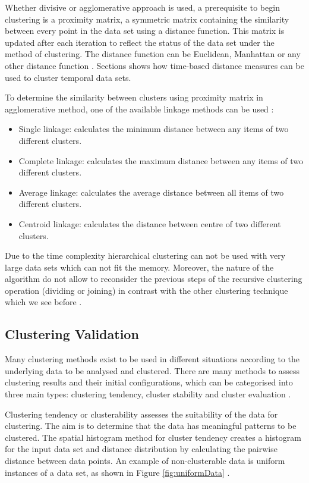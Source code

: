 Whether divisive or agglomerative approach is used, a prerequisite to begin clustering is a proximity matrix, a symmetric matrix containing the similarity between every point in the data set using a distance function. This matrix is updated after each iteration to reflect the status of the data set under the method of clustering. The distance function can be Euclidean, Manhattan or any other distance function \cite{Zaki2014}. Sections shows how time-based distance measures can be used to cluster temporal data sets.

To determine the similarity between clusters using proximity matrix in agglomerative method, one of the available linkage methods can be used \cite{Wang2006}:

\begin{itemize}
    \item Single linkage: calculates the minimum distance between any items of two different clusters.
    \item Complete linkage: calculates the maximum distance between any items of two different clusters.
    \item Average linkage: calculates the average distance between all items of two different clusters.
    \item Centroid linkage: calculates the distance between centre of two different clusters.
\end{itemize}

Due to the time complexity hierarchical clustering can not be used with very large data sets which can not fit the memory. Moreover, the nature of the algorithm do not allow to reconsider the previous steps of the recursive clustering operation (dividing or joining) in contrast with the other clustering technique which we see before \cite{Wang2006}. 


\subsection{Clustering Validation}

Many clustering methods exist to be used in different situations according to the underlying data to be analysed and clustered. There are many methods to assess clustering results and their initial configurations, which can be categorised into three main types: clustering tendency, cluster stability and cluster evaluation \cite{Zaki2014}. 

Clustering tendency or clusterability assesses the suitability of the data for clustering. The aim is to determine that the data has meaningful patterns to be clustered. The spatial histogram method for cluster tendency creates a histogram for the input data set and distance distribution by calculating the pairwise distance between data points. An example of non-clusterable data is uniform instances of a data set, as shown in Figure \ref{fig:uniformData} \cite{Zaki2014}. 

